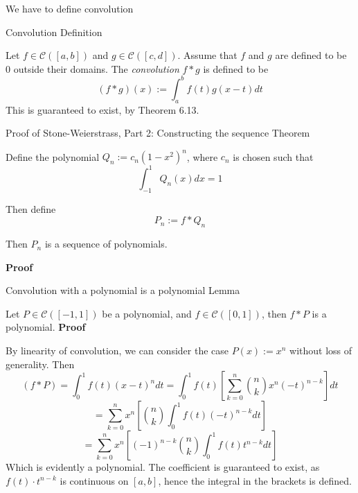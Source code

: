 We have to define convolution

\begin{result}
    {Convolution}
    {Definition}

    Let $f \in \mathscr{C}([a,b])$ and $g \in \mathscr{C}([c, d])$. Assume that $f$ and $g$ are defined to be $0$ outside their domains. The \textit{convolution} $f \ast g$ is defined to be
    \[(f \ast g)(x) := \int_a^b f(t)g(x-t) dt\]
    This is guaranteed to exist, by Theorem 6.13. 
\end{result}

\begin{result}
    {Proof of Stone-Weierstrass, Part 2: Constructing the sequence}
    {Theorem}

    Define the polynomial $Q_n := c_n(1-x^2)^n$, where $c_n$ is chosen such that
    \[\int_{-1}^1 Q_n(x)dx = 1\]

    Then define
    \[P_n := f \ast Q_n\]

    Then $P_n$ is a sequence of polynomials.

    \textbf{Proof}

    \begin{result}
        {Convolution with a polynomial is a polynomial}
        {Lemma}

        Let $P \in \mathscr{C}([-1, 1])$ be a polynomial, and $f \in \mathscr{C}([0, 1])$, then $f \ast P$ is a polynomial.
        \textbf{Proof}

        By linearity of convolution, we can consider the case $P(x) := x^n$ without loss of generality. Then
        \[(f \ast P) = \int_0^1 f(t)(x-t)^ndt = \int_0^1 f(t) \left[\sum_{k=0}^n \binom{n}{k}x^{n}(-t)^{n-k}\right]dt\]
        \[= \sum_{k=0}^n x^n \left[\binom{n}{k}\int_0^1 f(t) (-t)^{n-k}dt\right]\]
        \[= \sum_{k=0}^n x^n \left[(-1)^{n-k}\binom{n}{k}\int_0^1 f(t)t^{n-k}dt\right]\]
        Which is evidently a polynomial. The coefficient is guaranteed to exist, as $f(t) \cdot t^{n-k}$ is continuous on $[a, b]$, hence the integral in the brackets is defined.
    \end{result}

\end{result}


